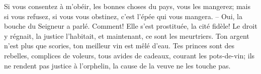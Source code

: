 Si vous consentez à m’obéir, les bonnes choses du pays, vous les mangerez;
	mais si vous refusez, si vous vous obstinez, c’est l’épée qui vous mangera.
	– Oui, la bouche du Seigneur a parlé.
Comment! Elle s’est prostituée, la cité fidèle!
	Le droit y régnait, la justice l’habitait,
	et maintenant, ce sont les meurtriers.
Ton argent n’est plus que scories, ton meilleur vin est mêlé d’eau.
Tes princes sont des rebelles, complices de voleurs,
	tous avides de cadeaux, courant les pots-de-vin;
	ils ne rendent pas justice à l’orphelin,
	la cause de la veuve ne les touche pas.
